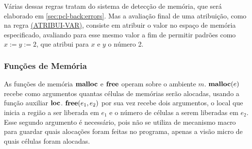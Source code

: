 




Várias dessas regras tratam do sistema de detecção de memória, que será elaborado em \ref{sec:pcl-back:errors}. Mas a avaliação final de uma atribuição, como na regra \hyperref[rule:atribui-var]{(ATRIBUI-VAR)}, consiste em atribuir o valor no espaço de memória especificado, avaliando para esse mesmo valor a fim de permitir padrões como $x := y := 2$, que atribui para $x$ e $y$ o número 2.

\subsubsection{Funções de Memória}
\label{sec:pcl-back:semantica:mem-func}

As funções de memória $\mathbf{malloc}$ e $\mathbf{free}$ operam sobre o ambiente $m$. $\mathbf{malloc}(e)$ recebe como argumentos quantas células de memórias serão alocadas, usando a função auxiliar \hyperref[fig:def:loc]{$\mathbf{loc}$}. $\mathbf{free}(e_1, e_2)$ por sua vez recebe dois argumentos, o local que inicia a região a ser liberada em $e_1$ e o número de células a serem liberadas em $e_2$. Esse segundo argumento é necessário, pois não se utiliza de mecanismo macro para guardar quais alocações foram feitas no programa, apenas a visão micro de quais células foram alocadas.

